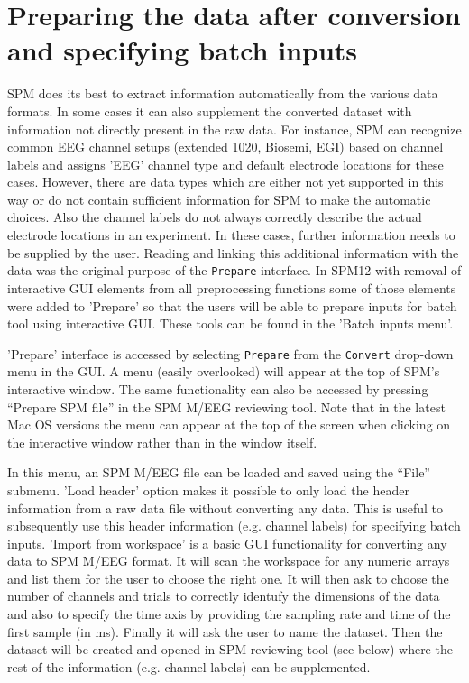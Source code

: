 \section{Preparing the data after conversion and specifying batch inputs}
SPM does its best to extract information automatically from the various data formats. In some cases it can also supplement the converted dataset with information not directly present in the raw data. For instance, SPM can recognize common EEG channel setups (extended 1020, Biosemi, EGI) based on channel labels and assigns 'EEG' channel type and default electrode locations for these cases. However, there are data types which are either not yet supported in this way or do not contain sufficient information for SPM to make the automatic choices. Also the channel labels do not always correctly describe the actual electrode locations in an experiment. In these cases, further information needs to be supplied by the user. Reading and linking this additional information with the data was the original purpose of the \texttt{Prepare} interface. In SPM12 with removal of interactive GUI elements from all preprocessing functions some of those elements were added to 'Prepare' so that the users will be able to prepare inputs for batch tool using interactive GUI. These tools can be found in the 'Batch inputs menu'.

'Prepare' interface is accessed by selecting \texttt{Prepare} from the \texttt{Convert} drop-down menu in the GUI. A menu (easily overlooked) will appear at the top of SPM's interactive window. The same functionality can also be accessed by pressing ``Prepare SPM file'' in the SPM M/EEG reviewing tool. Note that in the latest Mac OS versions the menu can appear at the top of the screen when clicking on the interactive window rather than in the window itself.

In this menu, an SPM M/EEG file can be loaded and saved using the ``File'' submenu. 'Load header' option makes it possible to only load the header information from a raw data file without converting any data. This is useful to subsequently use this header information (e.g. channel labels) for specifying batch inputs. 'Import from workspace' is a basic GUI functionality for converting any data to SPM M/EEG format. It will scan the workspace for any numeric arrays and list them for the user to choose the right one. It will then ask to choose the number of channels and trials to correctly identufy the dimensions of the data and also to specify the time axis by providing the sampling rate and time of the first sample (in ms). Finally it will ask the user to name the dataset. Then the dataset will be created and opened in SPM reviewing tool (see below) where the rest of the information (e.g. channel labels) can be supplemented. 

